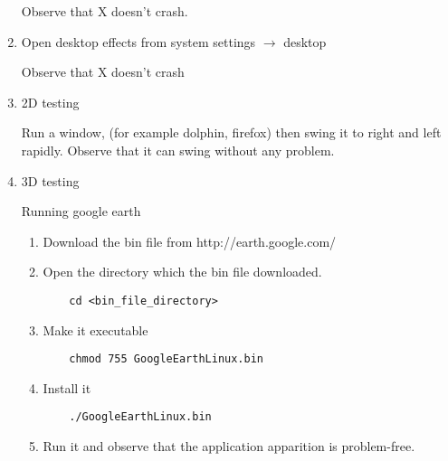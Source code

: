 \documentclass[a4paper,10pt]{article}
\begin{document}
\begin{enumerate}
      Observe that X doesn't crash.
 \item Open desktop effects from system settings $\rightarrow$ desktop
 
      Observe that X doesn't crash
  \item 2D testing 
      
      Run a window, (for example dolphin, firefox) then swing it to right and left rapidly.
        Observe that it can swing without any problem.

 \item 3D testing

    Running google earth
     \begin{enumerate}
      \item Download the bin file from http://earth.google.com/
      \item Open the directory which the bin file downloaded.
	\begin{verbatim}
	cd <bin_file_directory>
	\end{verbatim}
      \item Make it executable
	\begin{verbatim}
	chmod 755 GoogleEarthLinux.bin
	\end{verbatim}
      \item Install it 
	\begin{verbatim}
	./GoogleEarthLinux.bin
	\end{verbatim}
      \item Run it and observe that the application apparition is problem-free.
    \end{enumerate}
\end{enumerate}
\end{document}
